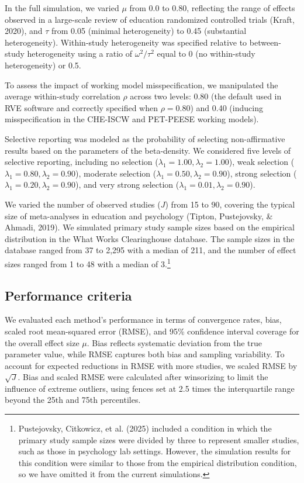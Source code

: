 \documentclass[
  american,
  man, donotrepeattitle,floatsintext]{apa7}
\begin{document}
In the full simulation, we varied \(\mu\) from 0.0 to 0.80, reflecting the range of effects observed in a large-scale review of education randomized controlled trials (Kraft, 2020), and \(\tau\) from 0.05 (minimal heterogeneity) to 0.45 (substantial heterogeneity). Within-study heterogeneity was specified relative to between-study heterogeneity using a ratio of \(\omega^2 / \tau^2\) equal to 0 (no within-study heterogeneity) or 0.5.

To assess the impact of working model misspecification, we manipulated the average within-study correlation \(\rho\) across two levels: 0.80 (the default used in RVE software and correctly specified when \(\rho = 0.80\)) and 0.40 (inducing misspecification in the CHE-ISCW and PET-PEESE working models).

Selective reporting was modeled as the probability of selecting non-affirmative results based on the parameters of the beta-density. We considered five levels of selective reporting, including no selection (\(\lambda_1 = 1.00, \lambda_2 = 1.00\)), weak selection (\(\lambda_1 = 0.80, \lambda_2 = 0.90\)), moderate selection (\(\lambda_1 = 0.50, \lambda_2 = 0.90\)), strong selection (\(\lambda_1 = 0.20, \lambda_2 = 0.90\)), and very strong selection (\(\lambda_1 = 0.01, \lambda_2 = 0.90\)).

We varied the number of observed studies (\(J\)) from 15 to 90, covering the typical size of meta-analyses in education and psychology (Tipton, Pustejovsky, \& Ahmadi, 2019).
We simulated primary study sample sizes based on the empirical distribution in the What Works Clearinghouse database. The sample sizes in the database ranged from 37 to 2,295 with a median of 211, and the number of effect sizes ranged from 1 to 48 with a median of 3.\footnote{
  Pustejovsky, Citkowicz, et al. (2025) included a condition in which the primary study sample sizes were divided by three to represent smaller studies, such as those in psychology lab settings. However, the simulation results for this condition were similar to those from the empirical distribution condition, so we have omitted it from the current simulations.}

\subsection{Performance criteria}\label{performance-criteria}

We evaluated each method's performance in terms of convergence rates, bias, scaled root mean-squared error (RMSE), and 95\% confidence interval coverage for the overall effect size \(\mu\).
Bias reflects systematic deviation from the true parameter value, while RMSE captures both bias and sampling variability.
To account for expected reductions in RMSE with more studies, we scaled RMSE by \(\sqrt{J}\).
Bias and scaled RMSE were calculated after winsorizing to limit the influence of extreme outliers, using fences set at 2.5 times the interquartile range beyond the 25th and 75th percentiles.
\end{document}
